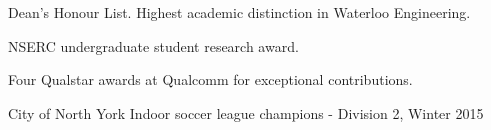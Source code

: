 

\begin{cventries}

\vspace{-5mm}

  \cventry
    {}
    {}
    {}
    {}
    {
      \begin{cvitems} %
        \item {Dean's Honour List. Highest academic distinction in Waterloo Engineering.}
        \item {NSERC undergraduate student research award.}
        \item {Four Qualstar awards at Qualcomm for exceptional contributions.}
        \item {City of North York Indoor soccer league champions - Division 2, Winter 2015}
      \end{cvitems}
    }

\end{cventries}